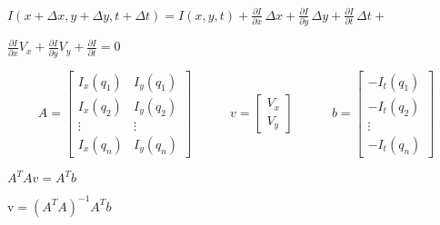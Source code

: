 \documentclass{article}
\begin{document}
$ I(x+\Delta x,y+\Delta y,t+\Delta t) = I(x,y,t) + \frac{\partial I}{\partial x}\,\Delta x+\frac{\partial I}{\partial y}\,\Delta y+\frac{\partial I}{\partial t} \, \Delta t+{} $
\pagebreak

$ \frac{\partial I}{\partial x}V_x+\frac{\partial I}{\partial y}V_y+\frac{\partial I}{\partial t} = 0 $
\pagebreak

\[ A = \begin{bmatrix} I_x(q_1) & I_y(q_1) \\[10pt] I_x(q_2) & I_y(q_2) \\[10pt] \vdots & \vdots \\[10pt] I_x(q_n) & I_y(q_n) \end{bmatrix} \quad\quad\quad v = \begin{bmatrix} V_x\\[10pt] V_y \end{bmatrix} \quad\quad\quad b = \begin{bmatrix} -I_t(q_1) \\[10pt] -I_t(q_2) \\[10pt] \vdots \\[10pt] -I_t(q_n) \end{bmatrix} \]
\pagebreak

$ A^T A v=A^T b $
\pagebreak

$ \mathrm{v}=(A^T A)^{-1}A^T b $
\pagebreak
\end{document}
